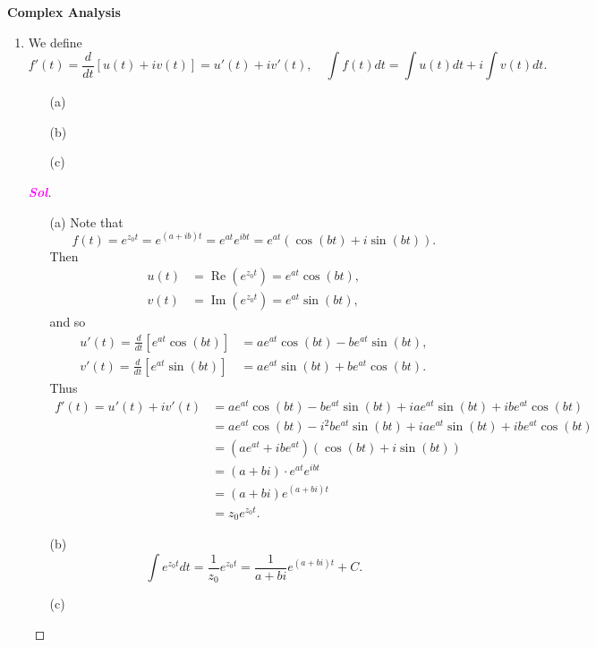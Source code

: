 \documentclass{article}
\theoremstyle{definition}
\newcommand{\of}[1]{\left( #1 \right)}
\newcommand{\sol}{\textcolor{magenta}{\bf Sol}}
\renewcommand{\Re}{\operatorname{Re}}
\renewcommand{\Im}{\operatorname{Im}}
\begin{document}
	\begin{center}
		\huge\textbf{Complex Analysis}\\
		\vspace{0.5em}
	\end{center}
	
	\begin{enumerate}
		\item We define \[
		f'\of{t}=\frac{d}{dt}\left[u\of{t}+iv\of{t}\right] = u'\of{t}+iv'\of{t},\quad
		\int f\of{t}dt = \int u\of{t}dt + i\int v\of{t}dt.
		\] \begin{itemize}
			\item[(a)]
			\item[(b)]
			\item[(c)]
		\end{itemize}
		\begin{proof}[\sol]
			\begin{itemize}
				\item[(a)] Note that \[
				f\of{t}=e^{z_0t}=e^{\of{a+ib}t}=e^{at}e^{i bt}=e^{at}\of{\cos\of{bt}+i\sin\of{bt}}.
				\] Then \begin{align*}
				u\of{t} &=\Re\of{e^{z_0t}}=e^{at}\cos\of{bt},\\
				v\of{t} &=\Im\of{e^{z_0t}}=e^{at}\sin\of{bt},
				\end{align*} and so \begin{align*}
				u'\of{t}=\frac{d}{dt}\left[e^{at}\cos\of{bt}\right]&=ae^{at}\cos\of{bt}-be^{at}\sin\of{bt},\\
				v'\of{t}=\frac{d}{dt}\left[e^{at}\sin\of{bt}\right]&=ae^{at}\sin\of{bt}+be^{at}\cos\of{bt}.
				\end{align*} Thus \begin{align*}
				f'\of{t}=u'\of{t}+iv'\of{t}&=ae^{at}\cos\of{bt}-be^{at}\sin\of{bt}+iae^{at}\sin\of{bt}+ibe^{at}\cos\of{bt}\\
				&=ae^{at}\cos\of{bt}-i^2be^{at}\sin\of{bt}+iae^{at}\sin\of{bt}+ibe^{at}\cos\of{bt}\\
				&=(ae^{at}+ibe^{at})\of{\cos\of{bt}+i\sin\of{bt}}\\
				&=\of{a+bi}\cdot e^{at}e^{ibt}\\
				&=\of{a+bi}e^{\of{a+bi}t}\\
				&=z_0e^{z_0t}.
				\end{align*}
				\item[(b)] \[
				\int e^{z_0t}dt = \frac{1}{z_0}e^{z_0t}=\frac{1}{a+bi}e^{\of{a+bi}t}+C.
				\]
				\item[(c)] \begin{itemize}

\end{itemize}
\end{itemize}
\end{proof}
\end{enumerate}
\end{document}
